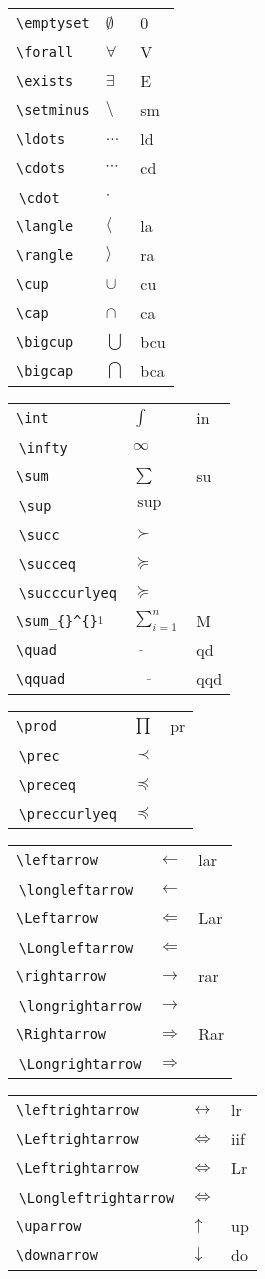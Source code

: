 \documentclass[10pt,landscape]{article}
\newcommand{\nl}{\\[.3ex]}
\newcommand{\nlt}{\\[.3ex]}
\newcommand{\ct}{\rotatebox[origin=c]{180}{$\Lsh$}\,}
\newcommand{\cst}{$\stackrel{1}{}$}
\begin{document}
\begin{multicols*}{3}
\begin{tabular}{@{}p{}  @{}p{} %
                @{}p{\the\MyKeyLen}@{}}
    \verb!\emptyset! & $\emptyset$ & 0 \nl
    \verb!\forall! & $\forall$ & V \nl
    \verb!\exists! & $\exists$ & E \nl
    \verb!\setminus! & $\setminus$ &  sm \nl
    \verb!\ldots! & $\ldots$ &  ld \nl
    \verb!\cdots! & $\cdots$ &  cd \nl
    \ct \verb!\cdot! & $\cdot$ &  \nl
    \verb!\langle! & $\langle$ &  la \nl
    \verb!\rangle! & $\rangle$ &  ra \nl
    \verb!\cup! & $\cup$ &  cu \nl
    \verb!\cap! & $\cap$ &  ca \nl
    \verb!\bigcup! & $\bigcup$ &  bcu \nl
    \verb!\bigcap! & $\bigcap$ &  bca \nlt
\end{tabular}

\begin{tabular}{@{}p{}  @{}p{} %
                @{}p{\the\MyKeyLen}@{}}
    \verb!\int! & $\int$ &  in \nl
    \ct \verb!\infty! & $\infty$ &   \nl
    \verb!\sum! & $\sum$ &  su \nl
    \ct \verb!\sup! & $\sup$ &   \nl
    \ct \verb!\succ! & $\succ$ &   \nl
    \ct \verb!\succeq! & $\succeq$ &   \nl
    \ct \verb!\succcurlyeq! & $\succcurlyeq$ &   \nl
    \verb!\sum_{}^{}!\cst & $\sum_{i=1}^{n}$ &  M \nl
    \verb!\quad! & $\underline{\quad}$ &  qd \nl
    \verb!\qquad! & $\underline{\qquad}$ &  qqd \nl
\end{tabular}

\begin{tabular}{@{}p{}  @{}p{} %
                @{}p{\the\MyKeyLen}@{}}
    \verb!\prod! & $\prod$ &  pr \nl
    \ct \verb!\prec! & $\prec$ &   \nl
    \ct \verb!\preceq! & $\preceq$ &   \nl
    \ct \verb!\preccurlyeq! & $\preccurlyeq$ &   \nlt
\end{tabular}

\begin{tabular}{@{}p{}  @{}p{} %
                @{}p{\the\MyKeyLen}@{}}
    \verb!\leftarrow! & $\leftarrow$ & lar \nl
    \ct \verb!\longleftarrow! & $\longleftarrow$ &  \nl
    \verb!\Leftarrow! & $\Leftarrow$ & Lar \nl
    \ct \verb!\Longleftarrow! & $\Longleftarrow$ &  \nl
    \verb!\rightarrow! & $\rightarrow$ & rar \nl
    \ct \verb!\longrightarrow! & $\longrightarrow$ &  \nl
    \verb!\Rightarrow! & $\Rightarrow$ & Rar \nl
    \ct \verb!\Longrightarrow! & $\Longrightarrow$ &  \nl
\end{tabular}
\begin{tabular}{@{}p{}  @{}p{} %
                @{}p{\the\MyKeyLen}@{}}
    \verb!\leftrightarrow! & $\leftrightarrow$ & lr \nl
    \verb!\Leftrightarrow! & $\Leftrightarrow$ & iif \nl
    \verb!\Leftrightarrow! & $\Leftrightarrow$ & Lr \nl
    \ct \verb!\Longleftrightarrow! & $\Longleftrightarrow$ &  \nl
    \verb!\uparrow! & $\uparrow$ & up \nl
    \verb!\downarrow! & $\downarrow$ & do \nlt
\end{tabular}


\end{multicols*}
\end{document}
